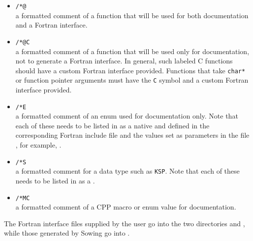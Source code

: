 \begin{itemize}
    \item
      \lstinline{/*@}\\      a formatted comment of a function that will be used for
        both documentation and a Fortran interface.
    \item
      \lstinline{/*@C}\\    a formatted comment of a function that will be used only for
        documentation, not to generate a Fortran interface. In general, such labeled C functions should have a custom Fortran interface provided. Functions that take \lstinline{char*} or function pointer arguments must have the \lstinline{C} symbol and a custom Fortran interface provided.
    \item
      \lstinline{/*E}\\     a formatted comment of an enum used for documentation only. Note that
        each of these needs to be listed in  as
        a native and defined in the corresponding
         Fortran include file and the values
        set as parameters in the file , for example, .
    \item
      \lstinline{/*S}\\     a formatted comment for a data type such as \lstinline{KSP}. Note that each of these
        needs to be listed in  as a .
    \item
      \lstinline{/*MC}\\    a formatted comment of a CPP macro or enum value for documentation.
\end{itemize}

The Fortran interface files supplied by the user go into the two directories   and , while those generated by Sowing go into .

